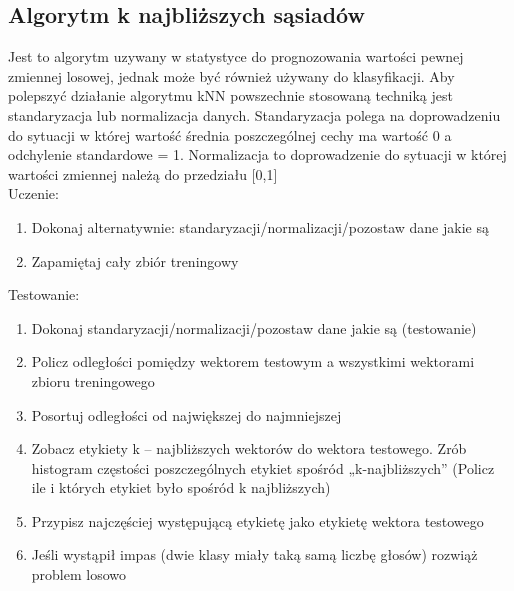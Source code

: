 \subsection{Algorytm k najbliższych sąsiadów}
Jest to algorytm uzywany w statystyce do prognozowania wartości pewnej zmiennej losowej, jednak może być również używany do klasyfikacji. Aby polepszyć działanie algorytmu kNN powszechnie stosowaną techniką jest standaryzacja lub normalizacja danych. Standaryzacja polega na doprowadzeniu do sytuacji w której wartość średnia poszczególnej cechy ma wartość 0 a odchylenie standardowe = 1. Normalizacja to  doprowadzenie do sytuacji w której wartości zmiennej należą do przedziału [0,1]
\newline
\\Uczenie:
\begin{enumerate}
  \item Dokonaj alternatywnie: standaryzacji/normalizacji/pozostaw dane jakie są
  \item Zapamiętaj cały zbiór treningowy
\end{enumerate}
Testowanie:
\begin{enumerate}
  \item Dokonaj standaryzacji/normalizacji/pozostaw dane jakie są (testowanie)
  \item Policz odległości pomiędzy wektorem testowym a wszystkimi wektorami zbioru treningowego
  \item Posortuj odległości od największej do najmniejszej
  \item Zobacz etykiety  k – najbliższych wektorów do wektora testowego.  Zrób histogram częstości poszczególnych etykiet spośród „k-najbliższych” (Policz ile i których etykiet było spośród k najbliższych)
  \item Przypisz najczęściej występującą etykietę jako etykietę wektora testowego 
  \item Jeśli wystąpił impas (dwie klasy miały taką samą liczbę głosów) rozwiąż problem losowo
\end{enumerate}
